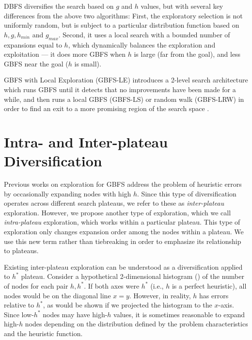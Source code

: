 DBFS \cite{imai2011novel} diversifies the
search based on $g$ and $h$ values, but with several key differences from
the above two algorithms: First, the exploratory selection is not uniformly
random, but is subject to a particular distribution function based on 
$h, g, h_{min}$ and $g_{max}$. Second, it uses a local search with
a bounded number of expansions equal to $h$, which dynamically balances the exploration
and exploitation --- it does more GBFS when $h$ is large (far
from the goal), and less GBFS near the goal ($h$ is small).

GBFS with Local Exploration (GBFS-LE) introduces a 2-level search architecture which runs
GBFS until it detects that no improvements have been made for a while, and
then runs a local GBFS (GBFS-LS) or random walk (GBFS-LRW)
in order to find an exit to a more promising region of the search space \cite{XieH14gbfsle}.

\section{Intra- and Inter-plateau Diversification}
\label{sec:intra-inter}

Previous works on exploration for GBFS  address the problem of heuristic errors
by occasionally expanding nodes with high $h$.
Since this type of diversification operates  across different search plateaus,
we refer to these as \emph{inter-plateau} exploration.
However, we propose another type of exploration,
which we call \emph{intra-plateau} exploration, which works within a particular plateau.
This type of exploration only changes expansion order among the nodes within a plateau.
We use this new term rather than tiebreaking in order to emphasize its relationship to plateaus.

Existing inter-plateau exploration can be understood as a diversification applied to $h^*$ plateau.
Consider a hypothetical  2-dimensional histogram () of the number of nodes for each pair $h,h^*$.
If both axes were $h^*$ (i.e., $h$ is a perfect heuristic), all nodes would be on the diagonal line $x=y$.
However, in reality, $h$ has errors relative to  $h^*$, as would be shown if we projected the histogram to the $x$-axis.
Since low-$h^*$ nodes may have high-$h$ values,
it is sometimes reasonable to expand
high-$h$ nodes depending on the distribution defined by the problem characteristics and the heuristic function.

